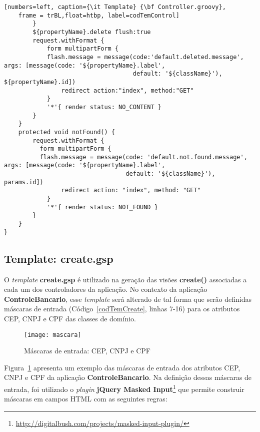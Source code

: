 \begin{lstlisting}[numbers=left, caption={\it Template} {\bf Controller.groovy},
    frame = trBL,float=htbp, label=codTemControl]
        }
        ${propertyName}.delete flush:true
        request.withFormat {
            form multipartForm {
            flash.message = message(code:'default.deleted.message', args: [message(code: '${propertyName}.label', 
                                    default: '${className}'), ${propertyName}.id])
                redirect action:"index", method:"GET"
            }
            '*'{ render status: NO_CONTENT }
        }
    }
    protected void notFound() {
        request.withFormat {
          form multipartForm {
          flash.message = message(code: 'default.not.found.message', args: [message(code: '${propertyName}.label', 
                                  default: '${className}'), params.id])
                redirect action: "index", method: "GET"
            }
            '*'{ render status: NOT_FOUND }
        }
    }
}
\end{lstlisting}

\subsection{Template: create.gsp}

\vspace{0.5cm}

O  {\it  template} {\bf  create.gsp}  é utilizado  na  geração  das visões  {\bf
  create()} associadas a cada um dos controladores da aplicação.  No contexto da
aplicação {\bf ControleBancario}, esse {\it template} será alterado de tal forma
que serão definidas máscaras de entrada (Código~\ref{codTemCreate}, linhas 7-16)
para os atributos CEP, CNPJ e CPF das classes de domínio.

\begin{figure}[htbp]
\centering\texttt{[image: mascara]}
\caption{Máscaras de entrada: CEP, CNPJ e CPF}
\label{figMascara}
\end{figure}

Figura~\ref{figMascara}  apresenta  um  exemplo  das  máscaras  de  entrada  dos
atributos  CEP, CNPJ  e CPF  da aplicação  {\bf ControleBancario}.  Na definição
dessas  máscaras de entrada,  foi utilizado  o {\it  plugin} {\bf  jQuery Masked
  Input}\footnote{\url{http://digitalbush.com/projects/masked-input-plugin/}}
que permite construir máscaras em campos HTML com as seguintes regras: 

